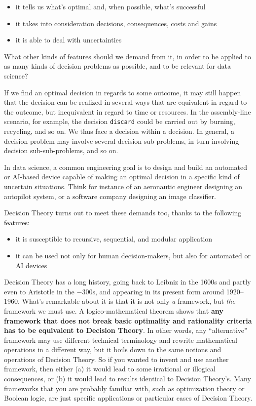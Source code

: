 \documentclass[
  a4paper,
  DIV=11,
  numbers=noendperiod,
  oneside]{scrreprt}
\begin{document}
\begin{itemize}
\item
  { it tells us what's optimal and, when possible, what's
  successful}
\item
  { it takes into consideration decisions, consequences,
  costs and gains}
\item
  { it is able to deal with uncertainties}
\end{itemize}

What other kinds of features should we demand from it, in order to be
applied to as many kinds of decision problems as possible, and to be
relevant for data science?

If we find an optimal decision in regards to some outcome, it may still
happen that the decision can be realized in several ways that are
equivalent in regard to the outcome, but inequivalent in regard to time
or resources. In the assembly-line scenario, for example, the decision
\texttt{discard} could be carried out by burning, recycling, and so on.
We thus face a decision within a decision. In general, a decision
problem may involve several decision sub-problems, in turn involving
decision sub-sub-problems, and so on.

In data science, a common engineering goal is to design and build an
automated or AI-based device capable of making an optimal decision in a
specific kind of uncertain situations. Think for instance of an
aeronautic engineer designing an autopilot system, or a software company
designing an image classifier.

Decision Theory turns out to meet these demands too, thanks to the
following features:

\begin{itemize}
\item
  { it is susceptible to recursive, sequential, and
  modular application}
\item
  { it can be used not only for human decision-makers, but
  also for automated or AI devices}
\end{itemize}

\hfill\break

Decision Theory has a long history, going back to Leibniz in the 1600s
and partly even to Aristotle in the −300s, and appearing in its present
form around 1920--1960. What's remarkable about it is that it is not
only \emph{a} framework, but \emph{the} framework we must use. A
logico-mathematical theorem shows that {\textbf{any framework that does
not break basic optimality and rationality criteria has to be equivalent
to Decision Theory}}. In other words, any ``alternative'' framework may
use different technical terminology and rewrite mathematical operations
in a different way, but it boils down to the same notions and operations
of Decision Theory. So if you wanted to invent and use another
framework, then either (a) it would lead to some irrational or illogical
consequences, or (b) it would lead to results identical to Decision
Theory's. Many frameworks that you are probably familiar with, such as
optimization theory or Boolean logic, are just specific applications or
particular cases of Decision Theory.
\end{document}
